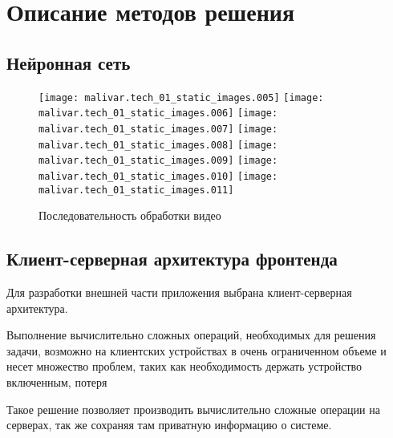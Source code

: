 
\section{Описание методов решения}

\subsection{Нейронная сеть}


\noindent

\begin{figure}
	\texttt{[image: malivar.tech\_01\_static\_images.005]}
	\texttt{[image: malivar.tech\_01\_static\_images.006]}
	\texttt{[image: malivar.tech\_01\_static\_images.007]}
	\texttt{[image: malivar.tech\_01\_static\_images.008]}
	\texttt{[image: malivar.tech\_01\_static\_images.009]}
	\texttt{[image: malivar.tech\_01\_static\_images.010]}
	\texttt{[image: malivar.tech\_01\_static\_images.011]}
	\caption{Последовательность обработки видео}
\end{figure}

\subsection{Клиент-серверная архитектура фронтенда}

Для разработки внешней части приложения выбрана клиент-серверная архитектура.

Выполнение вычислительно сложных операций, необходимых для решения задачи, возможно на клиентских устройствах в очень ограниченном объеме и несет множество проблем, таких как необходимость держать устройство включенным, потеря

Такое решение позволяет производить вычислительно сложные операции на серверах, так же сохраняя там приватную информацию о системе.

